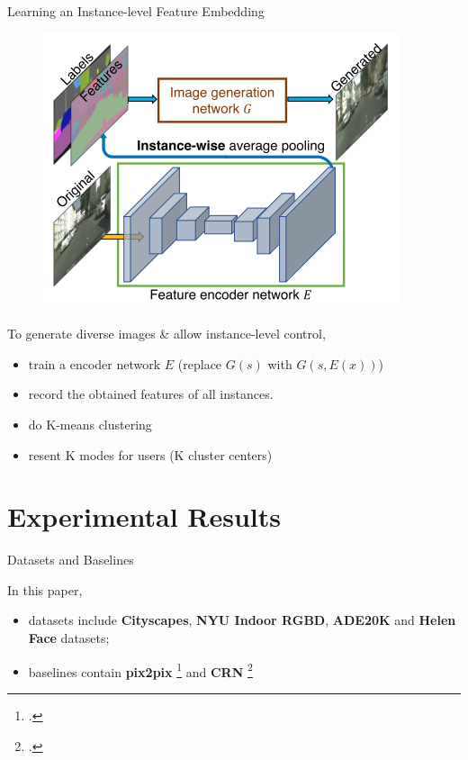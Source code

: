 \documentclass{beamer}
\begin{document}
\begin{frame}{Learning an Instance-level Feature Embedding}
\begin{figure}
	\centering
	\includegraphics[height=0.5\textheight]{images/instance}
\end{figure}
%
%
\begin{beamerboxesrounded}[upper=uppercol,lower=lowercol,shadow=false]{To generate diverse images \& allow instance-level control, }
\begin{itemize}
	\item
	train a encoder network $E$ (replace $G(s)$ with $G(s,E(x))$)
	\item
	record the obtained features of all instances.
	\item
	do K-means clustering 
	\item
	resent K modes for users (K cluster centers)
	
	\end{itemize}
\end{beamerboxesrounded}
\end{frame}







\section{Experimental Results}
\begin{frame}{Datasets and Baselines}
%
%
\begin{beamerboxesrounded}[upper=uppercol,lower=lowercol,shadow=false]{In this paper, }
	\begin{itemize}
		\item
	datasets include \textbf{Cityscapes}, \textbf{NYU Indoor RGBD}, \textbf{ADE20K} and \textbf{Helen Face} datasets;
		\item
	baselines contain \textbf{pix2pix} \footcite{Image-to-image translation with conditional adversarial networks (CVPR 2017)} and \textbf{CRN} \footcite{Photographic image synthesis with cascaded refinement networks (ICCV 2017)}
	\end{itemize}
\end{beamerboxesrounded}
\end{frame}
\end{document}
